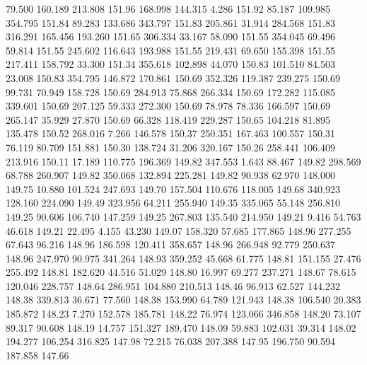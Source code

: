  79.500  160.189  213.808       151.96
 168.998  144.315    4.286       151.92
  85.187  109.985  354.795       151.84
  89.283  133.686  343.797       151.83
 205.861   31.914  284.568       151.83
 316.291  165.456  193.260       151.65
 306.334   33.167   58.090       151.55
 354.045   69.496   59.814       151.55
 245.602  116.643  193.988       151.55
 219.431   69.650  155.398       151.55
 217.411  158.792   33.300       151.34
 355.618  102.898   44.070       150.83
 101.510   84.503   23.008       150.83
 354.795  146.872  170.861       150.69
 352.326  119.387  239.275       150.69
  99.731   70.949  158.728       150.69
 284.913   75.868  266.334       150.69
 172.282  115.085  339.601       150.69
 207.125   59.333  272.300       150.69
  78.978   78.336  166.597       150.69
 265.147   35.929   27.870       150.69
  66.328  118.419  229.287       150.65
 104.218   81.895  135.478       150.52
 268.016    7.266  146.578       150.37
 250.351  167.463  100.557       150.31
  76.119   80.709  151.881       150.30
 138.724   31.206  320.167       150.26
 258.441  106.409  213.916       150.11
  17.189  110.775  196.369       149.82
 347.553    1.643   88.467       149.82
 298.569   68.788  260.907       149.82
 350.068  132.894  225.281       149.82
  90.938   62.970  148.000       149.75
  10.880  101.524  247.693       149.70
 157.504  110.676  118.005       149.68
 340.923  128.160  224.090       149.49
 323.956   64.211  255.940       149.35
 335.065   55.148  256.810       149.25
  90.606  106.740  147.259       149.25
 267.803  135.540  214.950       149.21
   9.416   54.763   46.618       149.21
  22.495    4.155   43.230       149.07
 158.320   57.685  177.865       148.96
 277.255   67.643   96.216       148.96
 186.598  120.411  358.657       148.96
 266.948   92.779  250.637       148.96
 247.970   90.975  341.264       148.93
 359.252   45.668   61.775       148.81
 151.155   27.476  255.492       148.81
 182.620   44.516   51.029       148.80
  16.997   69.277  237.271       148.67
  78.615  120.046  228.757       148.64
 286.951  104.880  210.513       148.46
  96.913   62.527  144.232       148.38
 339.813   36.671   77.560       148.38
 153.990   64.789  121.943       148.38
 106.540   20.383  185.872       148.23
   7.270  152.578  185.781       148.22
  76.974  123.066  346.858       148.20
  73.107   89.317   90.608       148.19
  14.757  151.327  189.470       148.09
  59.883  102.031   39.314       148.02
 194.277  106.254  316.825       147.98
  72.215   76.038  207.388       147.95
 196.750   90.594  187.858       147.66
